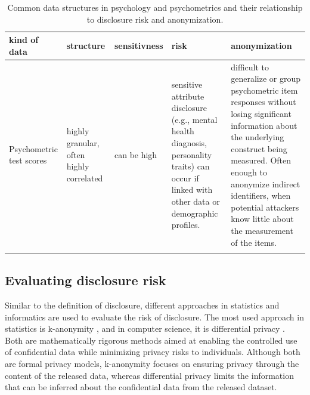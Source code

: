 \documentclass{article}
\begin{document}
\begin{table}[H]
\begin{small}

    \centering
    \begin{tabular}{p{2cm}|p{2cm}|p{2cm}|p{3cm}|p{5cm}|}
    \toprule
       kind of data  & structure  & sensitivness & risk & anonymization \\
       \midrule
       Psychometric test scores   & highly granular, often highly correlated & can be high & sensitive attribute disclosure (e.g., mental health diagnosis, personality traits) can occur if linked with other data or demographic profiles. & difficult to generalize or group psychometric item responses without losing significant information about the underlying construct being measured. Often enough to anonymize indirect identifiers, when potential attackers know little about the measurement of the items. \\
       \midrule
       &&&& \\
       \bottomrule
    \end{tabular}
    \caption{Common data structures in psychology and psychometrics and their relationship to disclosure risk and anonymization.}
    \label{tab:my_label}

\end{small}
\end{table}



\subsection{Evaluating disclosure risk}

Similar to the definition of disclosure, different approaches in statistics and informatics are used to evaluate the risk of disclosure. The most used approach in statistics is k-anonymity \cite{2002_Sweeney}, and in computer science, it is differential privacy \cite{2006_Dwork}. Both are mathematically rigorous methods aimed at enabling the controlled use of confidential data while minimizing privacy risks to individuals. Although both are formal privacy models, k-anonymity focuses on ensuring privacy through the content of the released data, whereas differential privacy limits the information that can be inferred about the confidential data from the released dataset.
\end{document}
